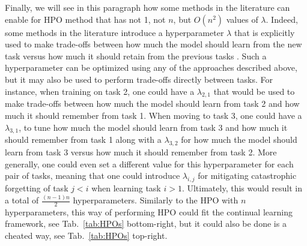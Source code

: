 \documentclass[11pt]{article}
\begin{document}
\vspace{2mm}
\noindent
Finally, we will see in this paragraph how some methods in the literature can enable for HPO method that has not 1, not $n$, but $O(n^2)$ values of $\lambda$. Indeed, some methods in the literature introduce a hyperparameter $\lambda$ that is explicitly used to make trade-offs between how much the model should learn from the new task versus how much it should retain from the previous tasks \cite{EWC_0}\cite{SI}\cite{afec}\cite{EWC_nuts_and_bolts}. Such a hyperparameter can be optimized using any of the approaches described above, but it may also be used to perform trade-offs directly between tasks. For instance, when training on task 2, one could have a $\lambda_{2,1}$ that would be used to make trade-offs between how much the model should learn from task 2 and how much it should remember from task 1. When moving to task 3, one could have a $\lambda_{3,1}$, to tune how much the model should learn from task 3 and how much it should remember from task 1 along with a $\lambda_{3,2}$ for how much the model should learn from task 3 versus how much it should remember from task 2. More generally, one could even set a different value for this hyperparameter for each pair of tasks, meaning that one could introduce $\lambda_{i,j}$ for mitigating catastrophic forgetting of task $j<i$ when learning task $i>1$. Ultimately, this would result in a total of $\frac{(n-1)n}{2}$ hyperparameters. Similarly to the HPO with $n$ hyperparameters, this way of performing HPO could fit the continual learning framework, see Tab.~\ref{tab:HPOs} bottom-right, but it could also be done is a cheated way, see Tab.~\ref{tab:HPOs} top-right.


\end{document}
